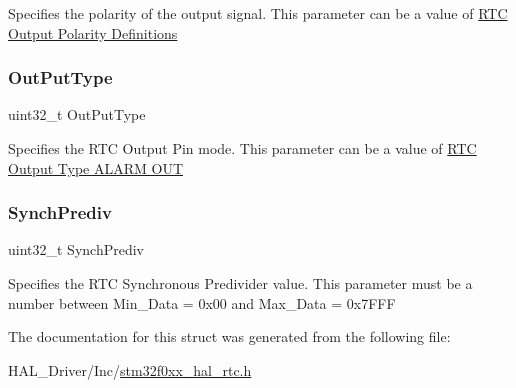 Specifies the polarity of the output signal. This parameter can be a value of \hyperlink{group___r_t_c___output___polarity___definitions}{R\+TC Output Polarity Definitions} \mbox{\label{struct_r_t_c___init_type_def_ad01c869fb5e798c037f1d0b04a52d80d}} 
\subsubsection{\texorpdfstring{Out\+Put\+Type}{OutPutType}}
{\footnotesize\ttfamily uint32\+\_\+t Out\+Put\+Type}

Specifies the R\+TC Output Pin mode. This parameter can be a value of \hyperlink{group___r_t_c___output___type___a_l_a_r_m___o_u_t}{R\+TC Output Type A\+L\+A\+RM O\+UT} \mbox{\label{struct_r_t_c___init_type_def_ae501e595c4cae92e73132b065baf726c}} 
\subsubsection{\texorpdfstring{Synch\+Prediv}{SynchPrediv}}
{\footnotesize\ttfamily uint32\+\_\+t Synch\+Prediv}

Specifies the R\+TC Synchronous Predivider value. This parameter must be a number between Min\+\_\+\+Data = 0x00 and Max\+\_\+\+Data = 0x7\+F\+FF 

The documentation for this struct was generated from the following file\+:\begin{DoxyCompactItemize}
\item 
H\+A\+L\+\_\+\+Driver/\+Inc/\hyperlink{stm32f0xx__hal__rtc_8h}{stm32f0xx\+\_\+hal\+\_\+rtc.\+h}\end{DoxyCompactItemize}
